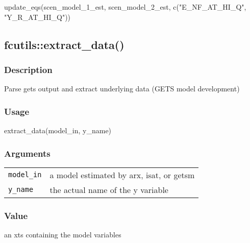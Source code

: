 \documentclass[
  letterpaper,
  DIV=11,
  numbers=noendperiod]{scrreport}
\newenvironment{Shaded}{\begin{snugshade}}{\end{snugshade}}
\newcommand{\FunctionTok}[1]{\textcolor[rgb]{0.28,0.35,0.67}{#1}}
\newcommand{\NormalTok}[1]{\textcolor[rgb]{0.00,0.23,0.31}{#1}}
\newcommand{\StringTok}[1]{\textcolor[rgb]{0.13,0.47,0.30}{#1}}
\begin{document}
\begin{Shaded}
\begin{Highlighting}[]
\FunctionTok{update\_eqs}\NormalTok{(scen\_model\_1\_est, scen\_model\_2\_est, }\FunctionTok{c}\NormalTok{(}\StringTok{"E\_NF\_AT\_HI\_Q"}\NormalTok{, }\StringTok{"Y\_R\_AT\_HI\_Q"}\NormalTok{))}
\end{Highlighting}
\end{Shaded}

\subsection{fcutils::extract\_data()}\label{fcutilsextract_data}

\subsubsection{Description}\label{description-86}

Parse gets output and extract underlying data (GETS model development)

\subsubsection{Usage}\label{usage-86}

\begin{Shaded}
\begin{Highlighting}[]
\FunctionTok{extract\_data}\NormalTok{(model\_in, y\_name)}
\end{Highlighting}
\end{Shaded}

\subsubsection{Arguments}\label{arguments-86}

\begin{longtable}[]{@{}ll@{}}
\toprule\noalign{}
\endhead
\bottomrule\noalign{}
\endlastfoot
\texttt{model\_in} & a model estimated by arx, isat, or getsm \\
\texttt{y\_name} & the actual name of the y variable \\
\end{longtable}

\subsubsection{Value}\label{value-73}

an xts containing the model variables
\end{document}
